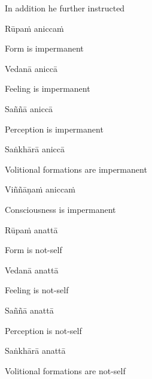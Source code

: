 \begin{english}
  In addition he further instructed
\end{english}

Rūpaṁ aniccaṁ

\begin{english}
  Form is impermanent
\end{english}

Vedanā aniccā

\begin{english}
  Feeling is impermanent
\end{english}

Saññā aniccā

\begin{english}
  Perception is impermanent
\end{english}

Saṅkhārā aniccā

\begin{english}
  Volitional formations are impermanent\hyperlink{endnote18-appendix}{\hypertarget{endnote18-body}{}}
\end{english}

Viññāṇaṁ aniccaṁ

\begin{english}
  Consciousness is impermanent\hyperlink{endnote19-appendix}{\hypertarget{endnote19-body}{}}
\end{english}

Rūpaṁ anattā

\begin{english}
  Form is not-self
\end{english}

Vedanā anattā

\begin{english}
  Feeling is not-self
\end{english}

Saññā anattā

\begin{english}
  Perception is not-self
\end{english}

Saṅkhārā anattā

\begin{english}
  Volitional formations are not-self\hyperlink{endnote20-appendix}{\hypertarget{endnote20-body}{}}
\end{english}


